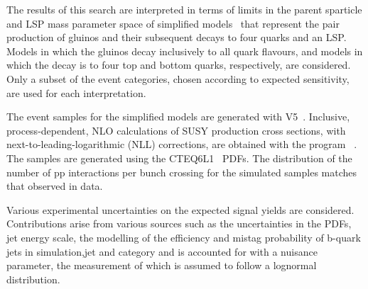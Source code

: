 The results of this search are interpreted in terms of limits in the
parent sparticle and LSP mass parameter space of simplified
models~\cite{Alwall:2008ag, Alwall:2008va, sms} that represent the pair production of gluinos and their subsequent decays to four quarks 
and an LSP. Models in which the gluinos decay inclusively to all quark flavours, and models in which the decay is to four top and bottom quarks, respectively, are considered. 
%
Only a subset of the event categories, chosen according to expected sensitivity, are used for
each interpretation.

The event samples for the simplified models are generated 
with \MADGRAPH V5~\cite{madgraph}.
Inclusive, process-dependent, NLO
calculations of SUSY production cross sections, with
next-to-leading-logarithmic (NLL) corrections, are obtained with the
program \PROSPINO~\cite{Beenakker:1996ch, PhysRevD.80.095004,
  PhysRevLett.102.111802, PhysRevD.80.095004, 1126-6708-2009-12-041,
  doi:10.1142/S0217751X11053560, susy-nlo-nll}. The samples are
generated using the CTEQ6L1~\cite{Pumplin:2002vw} PDFs. The
distribution of the number of pp interactions per bunch crossing for
the simulated samples matches that observed in data.

Various experimental uncertainties on the expected signal yields are
considered. Contributions arise from
various sources such as the uncertainties in the PDFs, jet energy
scale, the modelling of the efficiency and mistag probability of
b-quark jets in simulation,jet and \nb category
and is accounted for with a nuisance parameter, the measurement 
of which is assumed to follow a lognormal distribution.

